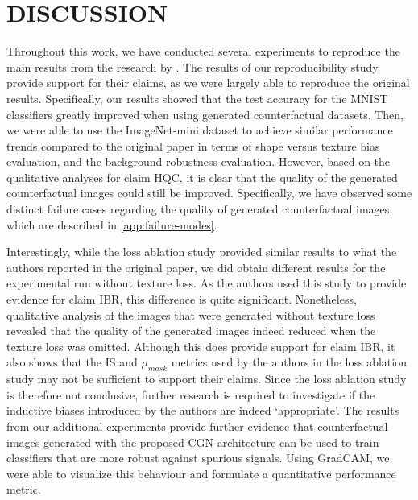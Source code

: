 \section{DISCUSSION} \label{sec:discussion}
Throughout this work, we have conducted several experiments to reproduce the main results from the research by \citet{Sauer2021ICLR}. The results of our reproducibility study provide support for their claims, as we were largely able to reproduce the original results. Specifically, our results showed that the test accuracy for the MNIST classifiers greatly improved when using generated counterfactual datasets. Then, we were able to use the ImageNet-mini dataset to achieve similar performance trends compared to the original paper in terms of shape versus texture bias evaluation, and the background robustness evaluation. However, based on the qualitative analyses for claim HQC, it is clear that the quality of the generated counterfactual images could still be improved. Specifically, we have observed some distinct failure cases regarding the quality of generated counterfactual images, which are described in \cref{app:failure-modes}.

Interestingly, while the loss ablation study provided similar results to what the authors reported in the original paper, we did obtain different results for the experimental run without texture loss. As the authors used this study to provide evidence for claim IBR, this difference is quite significant. Nonetheless, qualitative analysis of the images that were generated without texture loss revealed that the quality of the generated images indeed reduced when the texture loss was omitted. Although this does provide support for claim IBR, it also shows that the IS and $\mu_{mask}$ metrics used by the authors in the loss ablation study may not be sufficient to support their claims. Since the loss ablation study is therefore not conclusive, further research is required to investigate if the inductive biases introduced by the authors are indeed `appropriate'. The results from our additional experiments provide further evidence that counterfactual images generated with the proposed CGN architecture can be used to train classifiers that are more robust against spurious signals. Using GradCAM, we were able to visualize this behaviour and formulate a quantitative performance metric. 

